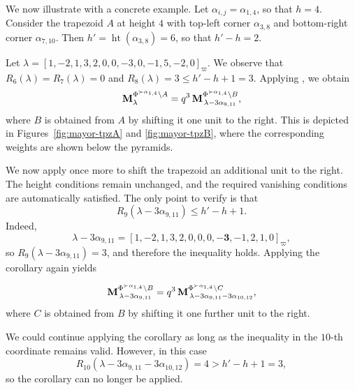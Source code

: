 \begin{example}\rm
We now illustrate  with a concrete example.
Let $\alpha_{i,j}=\alpha_{1,4}$, so that $h=4$. 
Consider the trapezoid $A$ at height $4$ with top-left corner $\alpha_{3,8}$ and bottom-right corner $\alpha_{7,10}$.
Then $h'=\operatorname{ht}(\alpha_{3,8})=6$, so that $h'-h=2$. 

Let $\lambda = [1,-2,1,3,2,0,0,-3,0,-1,5,-2,0]_{\varpi}$. 
We observe that $R_{6}(\lambda)=R_{7}(\lambda)=0$ and $R_{8}(\lambda)=3 \le h'-h+1=3$.
Applying , we obtain
\begin{equation}
    \mathbf{M}^{\Phi^{\succ \alpha_{1,4}} \setminus A}_\lambda
    =
    q^{3}\,
    \mathbf{M}^{\Phi^{\succ \alpha_{1,4}} \setminus B}_{\,\lambda - 3 \alpha_{9,11}},
\end{equation}
where $B$ is obtained from $A$ by shifting it one unit to the right. 
This is depicted in Figures~\ref{fig:mayor-tpzA} and \ref{fig:mayor-tpzB}, where the corresponding weights are shown below the pyramids.

\medskip

We now apply  once more to shift the trapezoid an additional unit to the right. 
The height conditions remain unchanged, and the required vanishing conditions are automatically satisfied.
The only point to verify is that
\begin{equation}
R_{9}(\lambda - 3\alpha_{9,11}) \le h'-h+1.
\end{equation}
Indeed,
\begin{equation}
\lambda - 3\alpha_{9,11}
=
[1,-2,1,3,2,0,0,0,\mathbf{-3},-1,2,1,0]_{\varpi},
\end{equation}
so $R_{9}(\lambda - 3\alpha_{9,11})=3$, and therefore the inequality holds.
Applying the corollary again yields

\begin{equation}
    \mathbf{M}^{\Phi^{\succ \alpha_{1,4}} \setminus B}_{\,\lambda - 3 \alpha_{9,11}}
    =
    q^{3}\,
    \mathbf{M}^{\Phi^{\succ \alpha_{1,4}} \setminus C}_{\,\lambda - 3 \alpha_{9,11} - 3 \alpha_{10,12}},
\end{equation}
where $C$ is obtained from $B$ by shifting it one further unit to the right.

\medskip

We could continue applying the corollary as long as the inequality in the $10$-th coordinate remains valid. 
However, in this case
\begin{equation}
    R_{10}(\lambda - 3 \alpha_{9,11} - 3 \alpha_{10,12}) = 4 > h'-h+1 = 3,
\end{equation}
so the corollary can no longer be applied.
\end{example}




